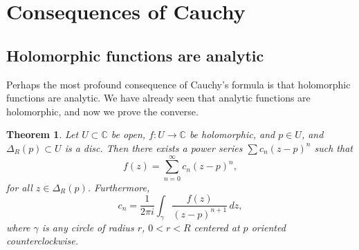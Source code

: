 \documentclass[12pt,openany]{book}
\newcommand{\C}{{\mathbb{C}}}
\theoremstyle{plain}
\newtheorem{thm}{Theorem}[section]
\theoremstyle{remark}
\theoremstyle{definition}
\theoremstyle{exercise}
\theoremstyle{example}
\begin{document}

\section{Consequences of Cauchy}
\label{sec:consequencescauchy}

\subsection{Holomorphic functions are analytic}

Perhaps the most profound consequence of Cauchy's formula is
that holomorphic functions are analytic.  We have already seen
that analytic functions are holomorphic, and now we prove the converse.

\begin{thm} \label{thm:holpower}
Let $U \subset \C$ be open, $f \colon U \to \C$ be
holomorphic, and $p \in U$, and $\Delta_R(p) \subset U$
is a disc.
Then there exists a power series $\sum c_n {(z-p)}^n$
such that
\begin{equation*}
f(z) = \sum_{n=0}^\infty c_n {(z-p)}^n ,
\end{equation*}
for all $z \in \Delta_R(p)$.
Furthermore,
\begin{equation*}
c_n = 
\frac{1}{2\pi i}
\int_{\gamma}
\frac{f(z)}{{(z-p)}^{n+1}}
\,
dz  ,
\end{equation*}
where $\gamma$ is any circle of radius $r$, $0 < r < R$ centered at
$p$ oriented counterclockwise.
\end{thm}
\end{document}
